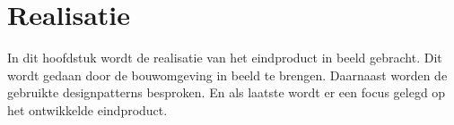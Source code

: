\chapter{Realisatie}
In dit hoofdstuk wordt de realisatie van het eindproduct in beeld gebracht.
Dit wordt gedaan door de bouwomgeving in beeld te brengen.
Daarnaast worden de gebruikte designpatterns besproken.
En als laatste wordt er een focus gelegd op het ontwikkelde eindproduct.



% 

